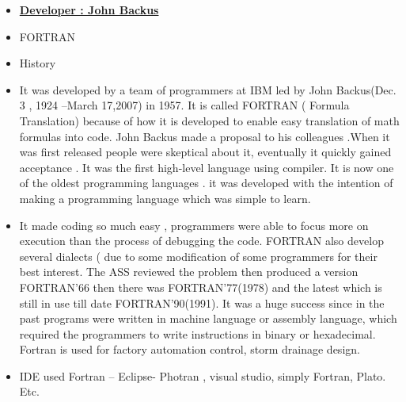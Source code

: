 \documentclass{article}
\begin{document}
	\begin{itemize}
		\item \textbf{\underline{Developer :  John Backus
		}}
	\item FORTRAN
	\item History
	\item It was developed by a team of programmers at IBM led by John Backus(Dec. 3 , 1924 –March 17,2007) in 1957. It is called FORTRAN ( Formula Translation)  because of how it is developed to enable easy translation of math formulas into code. John Backus made a proposal to his colleagues .When it was first released people were skeptical about it, eventually it quickly gained acceptance  . It was the first high-level language using compiler. It is now one of the oldest programming languages . it was developed with the intention of making a programming language which was simple to learn.
	\item   It made coding so much easy , programmers were able to focus more on execution than the process of debugging the code. FORTRAN also develop several dialects ( due to some modification of some programmers for their best interest. The ASS reviewed the problem then produced a version FORTRAN’66 then there was FORTRAN’77(1978) and the latest which is still in use till date FORTRAN’90(1991). It was a huge success since in the past programs were written in machine language or assembly language, which required the programmers to write instructions in binary or hexadecimal. Fortran is used for factory automation control, storm drainage design.
	\item IDE used Fortran – Eclipse- Photran , visual studio, simply Fortran, Plato. Etc.
	
	
	
	\end{itemize}
\end{document}

